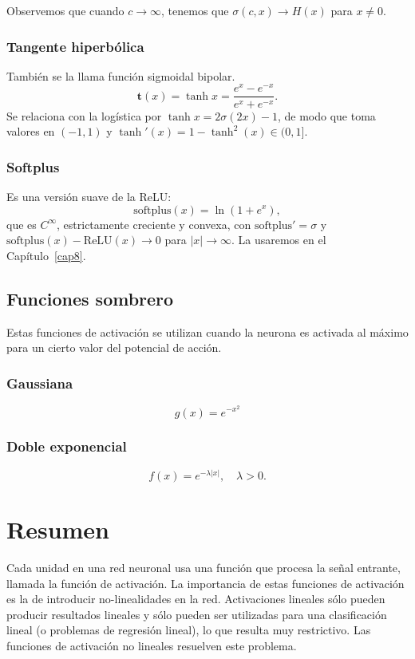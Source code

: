 \documentclass[12pt, a4paper]{amsbook}
\newcommand{\tb}{{\mathbf t}}
\theoremstyle{remark}
\theoremstyle{definition}
\numberwithin{section}{chapter}
\numberwithin{subsection}{section}
\numberwithin{equation}{section}
\numberwithin{figure}{chapter}
\begin{document}
Observemos que cuando $c\to\infty$, tenemos que $\sigma(c,x)\to H(x)$ para $x\neq 0$.

\subsubsection*{Tangente hiperbólica} También se la llama función sigmoidal bipolar.
$$
\tb(x) = \tanh x = \frac{e^x - e^{-x}}{e^x + e^{-x}}.
$$
Se relaciona con la logística por $\tanh x=2\sigma(2x)-1$, de modo que toma valores en $(-1,1)$ y $\tanh'(x)=1-\tanh^2(x)\in(0,1]$.

\subsubsection*{Softplus} Es una versión suave de la ReLU:
$$
\text{softplus}(x)=\ln(1+e^{x}),
$$
que es $C^\infty$, estrictamente creciente y convexa, con $\text{softplus}'=\sigma$ y $\text{softplus}(x)-\text{ReLU}(x)\to0$ para $|x|\to\infty$. La usaremos en el Capítulo~\ref{cap8}.

\subsection*{Funciones sombrero} Estas funciones de activación se utilizan cuando la neurona es activada al máximo para un cierto valor del potencial de acción.

\subsubsection*{Gaussiana} 
$$
g(x) = e^{-x^2}
$$

\subsubsection*{Doble exponencial} 
$$
f(x) = e^{-\lambda |x|},\quad \lambda>0.
$$


\section{Resumen}\label{sec.c2.2}
Cada unidad en una red neuronal usa una función que procesa la señal entrante, llamada la función de activación. La importancia de estas funciones de activación es la de introducir no-linealidades en la red. Activaciones lineales sólo pueden producir resultados lineales y sólo pueden ser utilizadas para una clasificación lineal (o problemas de regresión lineal), lo que resulta muy restrictivo. Las funciones de activación no lineales resuelven este problema.
\end{document}
